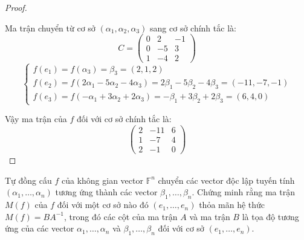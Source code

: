 \documentclass[class=nhvh-linear-algebra,crop=false]{standalone}
\begin{document}
\begin{proof}
\[    \]
    \par Ma trận chuyển từ cơ sở $(\alpha_{1}, \alpha_{2}, \alpha_{3})$ sang cơ sở chính tắc là:
    \[
        C =
        \begin{pmatrix}
            0 & 2  & -1 \\
            0 & -5 & 3  \\
            1 & -4 & 2
        \end{pmatrix}
    \]
    \[
        \begin{cases}
            f(e_{1}) = f(\alpha_{3}) = \beta_{3} = (2,1,2)                                                               \\
            f(e_{2}) = f(2\alpha_{1} - 5\alpha_{2} - 4\alpha_{3}) = 2\beta_{1} - 5\beta_{2} - 4\beta_{3} = (-11, -7, -1) \\
            f(e_{3}) = f(-\alpha_{1} + 3\alpha_{2} + 2\alpha_{3}) = -\beta_{1} + 3\beta_{2} + 2\beta_{3} = (6, 4, 0)
        \end{cases}
    \]
    \par Vậy ma trận của $f$ đối với cơ sở chính tắc là:
    \[
        \begin{pmatrix}
            2 & -11 & 6 \\
            1 & -7  & 4 \\
            2 & -1  & 0
        \end{pmatrix}
    \]
\end{proof}

\begin{exercise}
    Tự đồng cấu $f$ của không gian vector $\mathbb{F}^{n}$ chuyển các vector độc lập tuyến tính $(\alpha_{1}, \ldots, \alpha_{n})$ tương ứng thành các vector $\beta_{1}, \ldots, \beta_{n}$. Chứng minh rằng ma trận $M(f)$ của $f$ đối với một cơ sở nào đó $(e_{1},\ldots, e_{n})$ thỏa mãn hệ thức $M(f) = BA^{-1}$, trong đó các cột của ma trận $A$ và ma trận $B$ là tọa độ tương ứng của các vector $\alpha_{1}, \ldots, \alpha_{n}$ và $\beta_{1}, \ldots, \beta_{n}$ đối với cơ sở $(e_{1}, \ldots, e_{n})$.
\end{exercise}
\end{document}
